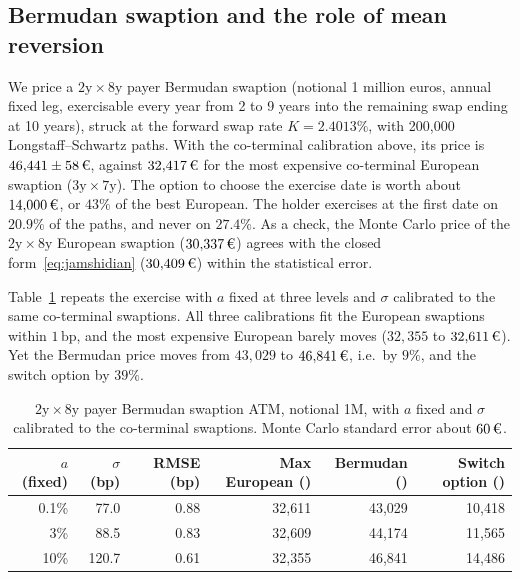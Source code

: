 \documentclass[11pt,a4paper]{article}
\theoremstyle{plain}
\theoremstyle{definition}
\newcommand{\bp}{\,\mathrm{bp}}
\newcommand{\eur}{\text{\texteuro}}
\begin{document}
\subsection{Bermudan swaption and the role of mean reversion}
\label{sec:bermudan-num}
We price a $2\text{y}\times8\text{y}$ payer Bermudan swaption (notional 1 million euros, annual fixed leg, exercisable every year from 2 to 9 years into the remaining swap ending at 10 years), struck at the forward swap rate $K=2.4013\%$, with 200{,}000 Longstaff--Schwartz paths. With the co-terminal calibration above, its price is $46{,}441\pm58\,\eur$, against $32{,}417\,\eur$ for the most expensive co-terminal European swaption ($3\text{y}\times7\text{y}$). The option to choose the exercise date is worth about $14{,}000\,\eur$, or $43\%$ of the best European. The holder exercises at the first date on $20.9\%$ of the paths, and never on $27.4\%$. As a check, the Monte Carlo price of the $2\text{y}\times8\text{y}$ European swaption ($30{,}337\,\eur$) agrees with the closed form~\eqref{eq:jamshidian} ($30{,}409\,\eur$) within the statistical error.

Table~\ref{tab:bermudan} repeats the exercise with $a$ fixed at three levels and $\sigma$ calibrated to the same co-terminal swaptions. All three calibrations fit the European swaptions within $1\bp$, and the most expensive European barely moves ($32{,}355$ to $32{,}611\,\eur$). Yet the Bermudan price moves from $43{,}029$ to $46{,}841\,\eur$, i.e.\ by $9\%$, and the switch option by $39\%$.

\begin{table}[htbp]
\centering
\small
\begin{tabular}{@{}rrrrrr@{}}
\toprule
$a$ (fixed) & $\sigma$ (bp) & RMSE (bp) & Max European (\eur) & Bermudan (\eur) & Switch option (\eur) \\
\midrule
0.1\% & 77.0  & 0.88 & 32{,}611 & 43{,}029 & 10{,}418 \\
3\%   & 88.5  & 0.83 & 32{,}609 & 44{,}174 & 11{,}565 \\
10\%  & 120.7 & 0.61 & 32{,}355 & 46{,}841 & 14{,}486 \\
\bottomrule
\end{tabular}
\caption{$2\text{y}\times8\text{y}$ payer Bermudan swaption ATM, notional 1M\eur, with $a$ fixed and $\sigma$ calibrated to the co-terminal swaptions. Monte Carlo standard error about $60\,\eur$.}
\label{tab:bermudan}
\end{table}
\end{document}
